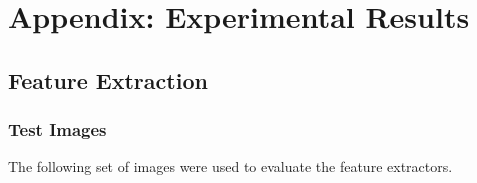 \chapter{Appendix: Experimental Results}
\section{Feature Extraction}
\subsection{Test Images}
The following set of images were used to evaluate the feature extractors.
\begin{figure}[H]%
\begin{center}

\end{center}
\end{figure}
